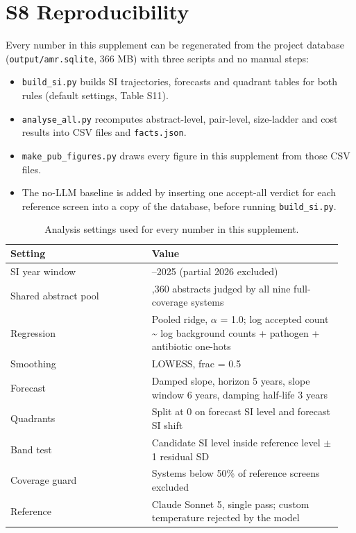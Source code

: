 \documentclass[11pt,a4paper]{article}
\begin{document}
\section{S8  Reproducibility}
Every number in this supplement can be regenerated from the project database (\texttt{output/amr.sqlite}, 366 MB) with three scripts and no manual steps:

\begin{itemize}
\item \texttt{build\_si.py} builds SI trajectories, forecasts and quadrant tables for both rules (default settings, Table S11).
\item \texttt{analyse\_all.py} recomputes abstract-level, pair-level, size-ladder and cost results into CSV files and \texttt{facts.json}.
\item \texttt{make\_pub\_figures.py} draws every figure in this supplement from those CSV files.
\item The no-LLM baseline is added by inserting one accept-all verdict for each reference screen into a copy of the database, before running \texttt{build\_si.py}.
\end{itemize}
\begin{table}[htbp]\centering\footnotesize
\caption{Analysis settings used for every number in this supplement.}\label{tab:settings}
\begin{tabular}{>{\raggedright\arraybackslash}p{0.404\linewidth}>{\raggedright\arraybackslash}p{0.542\linewidth}}
\toprule
\textbf{Setting} & \textbf{Value} \\
\midrule
SI year window & 2000--2025 (partial 2026 excluded) \\
Shared abstract pool & 70,360 abstracts judged by all nine full-coverage systems \\
Regression & Pooled ridge, $\alpha$ = 1.0; log accepted count \textasciitilde{} log background counts + pathogen + antibiotic one-hots \\
Smoothing & LOWESS, frac = 0.5 \\
Forecast & Damped slope, horizon 5 years, slope window 6 years, damping half-life 3 years \\
Quadrants & Split at 0 on forecast SI level and forecast SI shift \\
Band test & Candidate SI level inside reference level $\pm$ 1 residual SD \\
Coverage guard & Systems below 50\% of reference screens excluded \\
Reference & Claude Sonnet 5, single pass; custom temperature rejected by the model \\
\bottomrule
\end{tabular}
\end{table}
\end{document}
